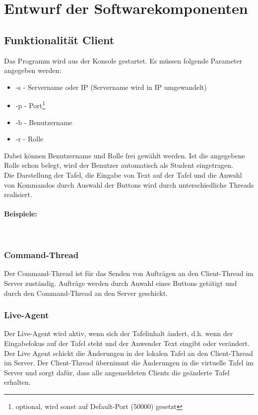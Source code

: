 \section{Entwurf der Softwarekomponenten}


\subsection{Funktionalität Client}
Das Programm wird aus der Konsole gestartet. Es müssen folgende Parameter angegeben werden:
\begin{itemize}
	\item -s - Servername oder IP (Servername wird in IP umgewandelt)
	\item -p - Port\footnote{optional, wird sonst auf Default-Port (50000) gesetzt}
	\item -b - Benutzername
	\item -r - Rolle
\end{itemize}
Dabei können Benutzername und Rolle frei gewählt werden. Ist die angegebene Rolle schon belegt, 
wird der Benutzer automatisch als Student eingetragen. \\
Die Darstellung der Tafel, die Eingabe von Text auf der Tafel und die Anwahl von Kommandos
durch Auswahl der Buttons wird durch unterschiedliche Threads realisiert.

\paragraph*{Beispiele: \\}
 \\

\subsubsection{Command-Thread}
Der Command-Thread ist für das Senden von Aufträgen an den Client-Thread im Server zuständig. 
Aufträge werden durch Anwahl eines Buttons getätigt und durch den Command-Thread an den Server geschickt.

\subsubsection{Live-Agent}
Der Live-Agent wird aktiv, wenn sich der Tafelinhalt ändert, d.h. wenn der Eingabefokus auf der
Tafel steht und der Anwender Text eingibt oder verändert. Der Live Agent schickt die Änderungen
in der lokalen Tafel an den Client-Thread im Server. Der Client-Thread übernimmt die Änderungen
in die virtuelle Tafel im Server und sorgt dafür, dass alle angemeldeten Clients die geänderte Tafel
erhalten.

